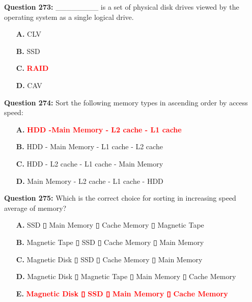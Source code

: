 \documentclass[12pt,a4paper]{article}
\begin{document}
\vspace{0.5cm}

\textbf{Question 273:} ________ is a set of physical disk drives viewed by the operating system as a single logical drive.

\begin{itemize}
    \item[\textbf{A.}] CLV
    \item[\textbf{B.}] SSD
    \item[\textbf{C.}] \textcolor{red}{\textbf{RAID}}
    \item[\textbf{D.}] CAV
\end{itemize}

\vspace{0.5cm}

\textbf{Question 274:} Sort the following memory types in ascending order by access speed:

\begin{itemize}
    \item[\textbf{A.}] \textcolor{red}{\textbf{HDD -Main Memory - L2 cache - L1 cache}}
    \item[\textbf{B.}] HDD - Main Memory - L1 cache - L2 cache
    \item[\textbf{C.}] HDD - L2 cache - L1 cache - Main Memory
    \item[\textbf{D.}] Main Memory - L2 cache - L1 cache - HDD
\end{itemize}

\vspace{0.5cm}

\textbf{Question 275:} Which is the correct choice for sorting in increasing speed average of memory?

\begin{itemize}
    \item[\textbf{A.}] SSD ▯ Main Memory ▯ Cache Memory ▯ Magnetic Tape
    \item[\textbf{B.}] Magnetic Tape ▯ SSD ▯ Cache Memory ▯ Main Memory
    \item[\textbf{C.}] Magnetic Disk ▯ SSD ▯ Cache Memory ▯ Main Memory
    \item[\textbf{D.}] Magnetic Disk ▯ Magnetic Tape ▯ Main Memory ▯ Cache Memory
    \item[\textbf{E.}] \textcolor{red}{\textbf{Magnetic Disk ▯ SSD ▯ Main Memory ▯ Cache Memory}}
\end{itemize}

\vspace{0.5cm}
\end{document}
